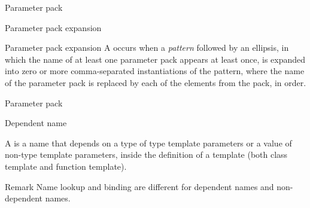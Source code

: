 \begin{frame}{Parameter pack}{}
  \begin{example}
  \end{example}
\end{frame}

\begin{frame}{Parameter pack expansion}{}
  \begin{block}{Parameter pack expansion}
    A  occurs when a \emph{pattern} followed by an ellipsis, in which the name of at least one parameter pack appears at least once, is expanded into zero or more comma-separated instantiations of the pattern, where the name of the parameter pack is replaced by each of the elements from the pack, in order.
  \end{block}
  \begin{example}
  \end{example}
\end{frame}

\begin{frame}{Parameter pack}{}
  \begin{example}
  \end{example}
\end{frame}

\begin{frame}{Dependent name}{}
  \begin{definition}
    A  is a name that depends on a type of type template parameters or a value of non-type template parameters, inside the definition of a template (both class template and function template).
  \end{definition}

  \begin{block}{Remark}
      Name lookup and binding are different for dependent names and non-dependent names.
  \end{block}
\end{frame}

